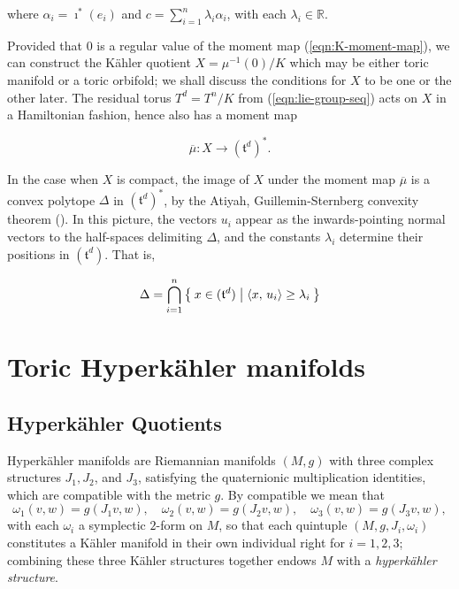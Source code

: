 \documentclass{amsart}
\newcommand{\lra}{\longrightarrow}
\newcommand{\w}{\omega}
\newcommand{\RR}{\mathbb{R}}
\newcommand{\mft}{\mathfrak{t}}
\newcommand{\mubar}{\overline{\mu}}
\begin{document}
    where $\alpha_{i} = \imath^{\ast}(e_{i})$ and $c = \sum_{i=1}^{n} \lambda_{i}\alpha_{i}$, with each $\lambda_{i} \in \RR$.
    
    Provided that $0$ is a regular value of the moment map (\ref{eqn:K-moment-map}), we can construct the K\"ahler quotient $X = \mu^{-1}(0)/K$ which may be either toric manifold or a toric orbifold; we shall discuss the conditions for $X$ to be one or the other later. The residual torus $T^{d} = T^{n}/K$ from (\ref{eqn:lie-group-seq}) acts on $X$ in a Hamiltonian fashion, hence also has a moment map
    
    \begin{equation}\label{eqn:Td-moment-map}
        \mubar : X \lra (\mft^{d})^{\ast}.
    \end{equation}

    In the case when $X$ is compact, the image of $X$ under the moment map $\mubar$ is a convex polytope $\Delta$ in $(\mft^{d})^{\ast}$, by the Atiyah, Guillemin-Sternberg convexity theorem (\cite{Ati82, GS82}). In this picture, the vectors $u_{i}$ appear as the inwards-pointing normal vectors to the half-spaces delimiting $\Delta$, and the constants $\lambda_{i}$ determine their positions in $(\mft^{d})$. That is,
    
    \begin{equation*}\label{eqn:polytope-half-spaces}
        \Delta = \bigcap_{i=1}^{n} \Set{x \in (\mft^{d}) | \langle x,\, u_{i} \rangle \geq \lambda_{i}}
    \end{equation*}
    
    
   
    
	\section{Toric Hyperk\"ahler manifolds}
	
	\subsection{Hyperk\"ahler Quotients}
	
	Hyperk\"ahler manifolds are Riemannian manifolds $(M,g)$ with three complex structures $J_{1}, J_{2}$, and $J_{3}$, satisfying the quaternionic multiplication identities, which are compatible with the metric $g$. By compatible we mean that
	\[
		\w_{1}(v,w) = g(J_{1}v,w),\quad \w_{2}(v,w) = g(J_{2}v,w),\quad \w_{3}(v,w) = g(J_{3}v,w),
	\]
	with each $\w_{i}$ a symplectic $2$-form on $M$, so that each quintuple $(M, g, J_{i}, \w_{i})$ constitutes a K\"ahler manifold in their own individual right for $i = 1, 2, 3$; combining these three K\"ahler structures together endows $M$ with a \emph{hyperk\"ahler structure}.
		
\end{document}
